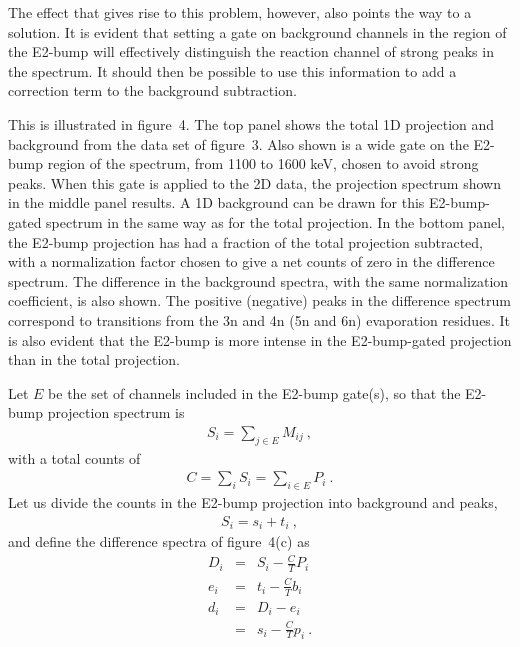 The effect that gives rise to this problem, however, also points the way to a
solution. It is evident that setting a gate on background channels in the
region of the E2-bump will effectively distinguish the reaction channel of
strong peaks in the spectrum. It should then be possible to use this
information to add a correction term to the background subtraction.

This is illustrated in figure~4. The top panel shows the total 1D projection
and background from the data set of figure~3. Also shown is a wide gate on the
E2-bump region of the spectrum, from 1100 to 1600 keV, chosen to avoid strong
peaks. When this gate is applied to the 2D data, the projection spectrum shown
in the middle panel results. A 1D background can be drawn for this
E2-bump-gated spectrum in the same way as for the total projection. In the
bottom panel, the E2-bump projection has had a fraction of the total projection
subtracted, with a normalization factor chosen to give a net counts of zero in
the difference spectrum. The difference in the background spectra, with the
same normalization coefficient, is also shown. The positive (negative) peaks in
the difference spectrum correspond to transitions from the 3n and 4n (5n and
6n) evaporation residues. It is also evident that the E2-bump is more intense
in the E2-bump-gated projection than in the total projection.

Let $E$ be the set of channels included in the E2-bump gate(s), so that the
E2-bump projection spectrum is 
\begin{eqnarray*}
S_i  = \sum_{j \in E} M_{ij} \ ,
\end{eqnarray*}
with a total counts of 
\begin{eqnarray*}
C = \sum_i S_i = \sum_{i \in E} P_i \ .
\end{eqnarray*}
Let us divide the counts in the E2-bump projection into background and peaks,
\begin{eqnarray*}
S_i  = s_i + t_i \ ,
\end{eqnarray*}
and define the difference spectra of figure~4(c) as
\begin{eqnarray*}
D_i & = & S_i - \frac {C}{T} P_i \\
e_i & = & t_i - \frac {C}{T} b_i \\
d_i & = & D_i - e_i \\
    & = & s_i - \frac {C}{T} p_i \ .
\end{eqnarray*}

